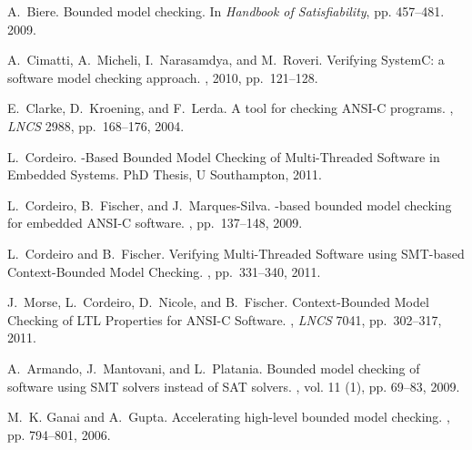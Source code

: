 \documentclass[a4paper]{llncs}
\begin{document}
\vspace{-2.5ex}
\renewcommand\refname{{\normalsize References}}
{\begin{thebibliography}{10}
\vspace{-0.5ex}


A.~Biere.
\newblock Bounded model checking.
\newblock In {\em Handbook of Satisfiability}, pp. 457--481. 2009.

A.~Cimatti, A.~Micheli, I.~Narasamdya, and M.~Roveri.
\newblock Verifying {SystemC}: a software model checking approach.
, 2010, pp.\ 121--128.

E.~Clarke, D.~Kroening, and F.~Lerda.
\newblock A tool for checking {ANSI-C} programs.
, {\em LNCS} 2988, pp.\ 168--176, 2004.

L.~Cordeiro.
-Based Bounded Model Checking of Multi-Threaded Software in 
Embedded Systems.
\newblock PhD Thesis, U Southampton, 2011.

L.~Cordeiro, B.~Fischer, and J.~Marques-Silva.
-based bounded model checking for embedded {ANSI-C} software.
, pp.\ 137--148, 2009. 

L.~Cordeiro and B.~Fischer.
\newblock Verifying Multi-Threaded Software using {SMT}-based Context-Bounded 
Model Checking.
, pp.\ 331--340, 2011. 


J.~Morse, L.~Cordeiro, D.~Nicole, and B.~Fischer.
\newblock Context-Bounded Model Checking of LTL Properties for ANSI-C Software.
, {\em LNCS} 7041, pp.\ 302--317, 2011.

A.~Armando, J.~Mantovani, and L.~Platania.
\newblock Bounded model checking of software using {SMT} solvers instead of
  {SAT} solvers.
, vol. 11 (1), pp. 69--83, 2009.

M.~K. Ganai and A.~Gupta.
\newblock Accelerating high-level bounded model checking.
, pp. 794--801, 2006.


\end{thebibliography}}
\end{document}
